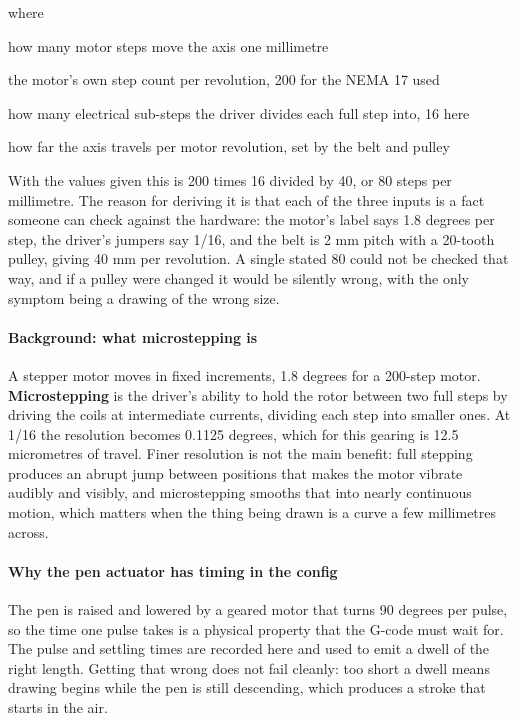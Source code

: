 \noindent where
\begin{description}[leftmargin=2.4em,style=nextline,font=\normalfont\ttfamily]\setlength\itemsep{1pt}
  \item[{$\mathrm{stepsPerMm}$}] \normalfont how many motor steps move the axis one millimetre
  \item[{$\mathrm{fullStepsPerRev}$}] \normalfont the motor's own step count per revolution, 200 for the NEMA 17 used
  \item[{$\mathrm{microstepping}$}] \normalfont how many electrical sub-steps the driver divides each full step into, 16 here
  \item[{$\mathrm{mmPerRev}$}] \normalfont how far the axis travels per motor revolution, set by the belt and pulley
\end{description}
With the values given this is 200 times 16 divided by 40, or 80 steps per millimetre. The reason for deriving it is that each of the three inputs is a fact someone can check against the hardware: the motor's label says 1.8 degrees per step, the driver's jumpers say 1/16, and the belt is 2 mm pitch with a 20-tooth pulley, giving 40 mm per revolution. A single stated 80 could not be checked that way, and if a pulley were changed it would be silently wrong, with the only symptom being a drawing of the wrong size.


\paragraph{Background: what microstepping is}
A stepper motor moves in fixed increments, 1.8 degrees for a 200-step motor. \textbf{Microstepping} is the driver's ability to hold the rotor between two full steps by driving the coils at intermediate currents, dividing each step into smaller ones. At 1/16 the resolution becomes 0.1125 degrees, which for this gearing is 12.5 micrometres of travel. Finer resolution is not the main benefit: full stepping produces an abrupt jump between positions that makes the motor vibrate audibly and visibly, and microstepping smooths that into nearly continuous motion, which matters when the thing being drawn is a curve a few millimetres across.


\paragraph{Why the pen actuator has timing in the config}
The pen is raised and lowered by a geared motor that turns 90 degrees per pulse, so the time one pulse takes is a physical property that the G-code must wait for. The pulse and settling times are recorded here and used to emit a dwell of the right length. Getting that wrong does not fail cleanly: too short a dwell means drawing begins while the pen is still descending, which produces a stroke that starts in the air.


